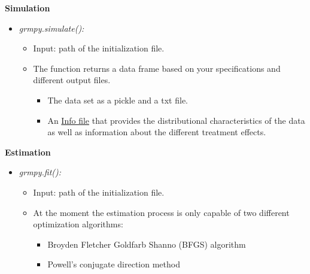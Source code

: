 \begin{frame}
\textbf{Simulation}

\medskip
\begin{itemize}\setlength\itemsep{1em}
\item \textit{grmpy.simulate():}

\medskip
\begin{itemize}\setlength\itemsep{1em}
\item Input: path of the initialization file.
\item The function returns a data frame based on your specifications and different output files.

\medskip
\begin{itemize}\setlength\itemsep{1em}
\item The data set as a pickle and a txt file.
\item An \href{examples/data.grmpy.info}{Info file} that provides the distributional characteristics of the data as well as information about the different treatment effects.
\end{itemize}

\end{itemize}
\end{itemize}
\end{frame}

\begin{frame}
\textbf{Estimation}

\medskip
\begin{itemize}\setlength\itemsep{1em}
\item \textit{grmpy.fit():}\medskip
  \begin{itemize}\setlength\itemsep{1em}
  \item Input: path of the initialization file.
  \item At the moment the estimation process is only capable of two different optimization algorithms:
  
  \medskip
    \begin{itemize}\setlength\itemsep{1em}
    \item Broyden Fletcher Goldfarb Shanno (BFGS) algorithm
    \item  Powell's conjugate direction method
\end{itemize}
\end{itemize}
\end{itemize}

\end{frame}

